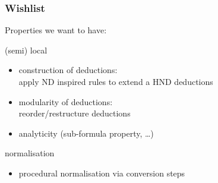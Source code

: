 \documentclass[aspectratio=169]%
  {beamer}
\begin{document}


\begin{frame}
  \frametitle{Wishlist}
  Properties we want to have:

  \begin{block}{(semi) local}
    \begin{itemize}
    \item construction of deductions:\\
      apply ND inspired rules to extend a HND deductions
    \item modularity of deductions:\\
      reorder/restructure deductions
    \item analyticity (sub-formula property, \ldots)
    \end{itemize}
  \end{block}

  \pause
  \begin{block}{normalisation}
    \begin{itemize}
    \item procedural normalisation via conversion steps
    \end{itemize}
  \end{block}
\end{frame}
\end{document}
